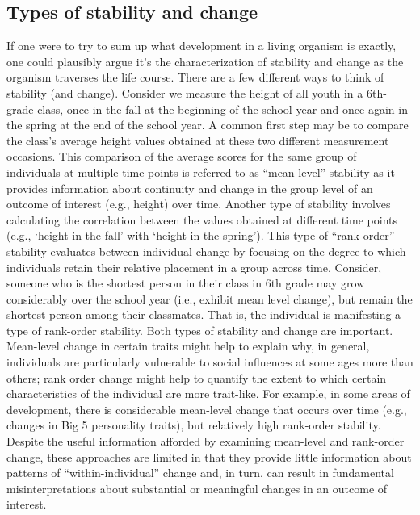 \documentclass[
  10pt,
  letterpaper,
]{article}
\begin{document}
\hypertarget{types-of-stability-and-change}{%
\subsection{Types of stability and
change}\label{types-of-stability-and-change}}

If one were to try to sum up what development in a living organism is
exactly, one could plausibly argue it's the characterization of
stability and change as the organism traverses the life course. There
are a few different ways to think of stability (and change). Consider we
measure the height of all youth in a 6th-grade class, once in the fall
at the beginning of the school year and once again in the spring at the
end of the school year. A common first step may be to compare the
class's average height values obtained at these two different
measurement occasions. This comparison of the average scores for the
same group of individuals at multiple time points is referred to as
``mean-level'' stability as it provides information about continuity and
change in the group level of an outcome of interest (e.g., height) over
time. Another type of stability involves calculating the correlation
between the values obtained at different time points (e.g., `height in
the fall' with `height in the spring'). This type of ``rank-order''
stability evaluates between-individual change by focusing on the degree
to which individuals retain their relative placement in a group across
time. Consider, someone who is the shortest person in their class in 6th
grade may grow considerably over the school year (i.e., exhibit mean
level change), but remain the shortest person among their classmates.
That is, the individual is manifesting a type of rank-order stability.
Both types of stability and change are important. Mean-level change in
certain traits might help to explain why, in general, individuals are
particularly vulnerable to social influences at some ages more than
others; rank order change might help to quantify the extent to which
certain characteristics of the individual are more trait-like. For
example, in some areas of development, there is considerable mean-level
change that occurs over time (e.g., changes in Big 5 personality
traits), but relatively high rank-order stability. Despite the useful
information afforded by examining mean-level and rank-order change,
these approaches are limited in that they provide little information
about patterns of ``within-individual'' change and, in turn, can result
in fundamental misinterpretations about substantial or meaningful
changes in an outcome of interest.
\end{document}
